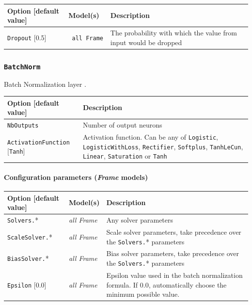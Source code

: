\documentclass[a4paper,11pt,oneside]{article}
\begin{document}
\begin{center}
 \begin{longtable}{| p{4cm} | p{3cm} | p{9cm} | }
 \hline
 Option [default value] & Model(s) & Description\\
 \hline\hline
  \lstinline!Dropout! [0.5] & \lstinline! all Frame ! & The probability with
  which the value from input would be dropped \\
 \hline
\end{longtable}
\end{center}


\subsubsection{\texorpdfstring{%
\lstinline[basicstyle=\ttfamily\bfseries]!BatchNorm!}{BatchNorm}}
Batch Normalization layer \citep{Ioffe2015}.

\begin{center}
 \begin{longtable}{| p{5cm} | p{10cm} | }
 \hline
 Option [default value] & Description\\
 \hline\hline
  \cellcolor{requiredcolor}\lstinline!NbOutputs! & Number of output neurons \\
  \lstinline!ActivationFunction! [\lstinline!Tanh!] & Activation function.
  Can be any of \lstinline!Logistic!,  \lstinline!LogisticWithLoss!,
  \lstinline!Rectifier!, \lstinline!Softplus!, \lstinline!TanhLeCun!,
  \lstinline!Linear!, \lstinline!Saturation! or \lstinline!Tanh! \\
  \hline
\end{longtable}
\end{center}

\paragraph{Configuration parameters (\emph{Frame} models)}

\begin{center}
 \begin{longtable}{| p{4cm} | p{3cm} | p{9cm} | }
 \hline
 Option [default value] & Model(s) & Description\\
 \hline\hline
  \lstinline!Solvers.!* & \emph{all Frame} & Any solver parameters \\
  \lstinline!ScaleSolver.!* & \emph{all Frame} & Scale solver parameters,
  take precedence over the \lstinline!Solvers.!* parameters \\
  \lstinline!BiasSolver.!* & \emph{all Frame} & Bias solver parameters,
  take precedence over the \lstinline!Solvers.!* parameters \\
  \lstinline!Epsilon! [0.0] & \emph{all Frame} & Epsilon value used in the batch normalization formula. If 0.0, automatically choose the minimum possible
  value. \\
 \hline
\end{longtable}
\end{center}
\end{document}
